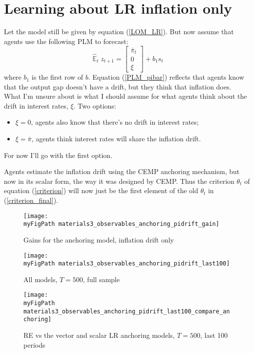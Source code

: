 \documentclass[11pt]{article}
\def \myFigPath {../figures/}
\renewcommand{\[}{\begin{equation}}
\renewcommand{\]}{\end{equation}}
\DeclareMathOperator{\E}{\mathbb{E}}
\def\myBiggerFigScale{0.4}
\def\myFigScale{0.3}
\begin{document}
\newpage
\section{Learning about LR inflation only}
 Let the model still be given by equation (\ref{LOM_LR}). But now assume that agents use the following PLM to forecast:
 \begin{equation}
 \hat{\E}_{t}z_{t+1} =  \begin{bmatrix} \bar{\pi}_{t} \\ 0 \\ \xi \label{PLM_pibar}
 \end{bmatrix} + b_1 s_t 
 \end{equation}
where $b_1$ is the first row of $b$. Equation (\ref{PLM_pibar}) reflects that agents know that the output gap doesn't have a drift, but they think that inflation does. What I'm unsure about is what I should assume for what agents think about the drift in interest rates, $\xi$. Two options:
\begin{itemize}
\item $\xi = 0$, agents also know that there's no drift in interest rates;
\item $\xi = \bar{\pi}$, agents think interest rates will share the inflation drift.  %
\end{itemize}
For now I'll go with the first option. 

Agents estimate the inflation drift using the CEMP anchoring mechanism, but now in its scalar form, the way it was designed by CEMP. Thus the criterion $\theta_t$ of equation (\ref{criterion}) will now just be the first element of the old $\theta_t$ in (\ref{criterion_final}). 

\begin{figure}[h!]
\texttt{[image: \\myFigPath materials3\_observables\_anchoring\_pidrift\_gain]} 
\caption{Gains for the anchoring model, inflation drift only}
\end{figure}
\newpage
\begin{figure}[h!]
\texttt{[image: \\myFigPath materials3\_observables\_anchoring\_pidrift\_last100]} 
\caption{All models, $T = 500$, full sample}
\end{figure}

\begin{figure}[h!]
\texttt{[image: \\myFigPath materials3\_observables\_anchoring\_pidrift\_last100\_compare\_anchoring]} 
\caption{RE vs the vector and scalar LR anchoring models, $T = 500$, last 100 periods}
\end{figure}
\newpage
\end{document}
